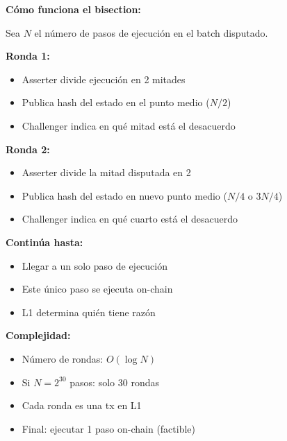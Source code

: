 \documentclass[11pt,a4paper,twoside,openright]{book}
\theoremstyle{definition}
\theoremstyle{plain}
\theoremstyle{remark}
\begin{document}
\begin{mathnote}
\textbf{Cómo funciona el bisection:}

Sea $N$ el número de pasos de ejecución en el batch disputado.

\textbf{Ronda 1:}
\begin{itemize}
    \item Asserter divide ejecución en 2 mitades
    \item Publica hash del estado en el punto medio ($N/2$)
    \item Challenger indica en qué mitad está el desacuerdo
\end{itemize}

\textbf{Ronda 2:}
\begin{itemize}
    \item Asserter divide la mitad disputada en 2
    \item Publica hash del estado en nuevo punto medio ($N/4$ o $3N/4$)
    \item Challenger indica en qué cuarto está el desacuerdo
\end{itemize}

\textbf{Continúa hasta:}
\begin{itemize}
    \item Llegar a un solo paso de ejecución
    \item Este único paso se ejecuta on-chain
    \item L1 determina quién tiene razón
\end{itemize}

\textbf{Complejidad:}
\begin{itemize}
    \item Número de rondas: $O(\log N)$
    \item Si $N = 2^{30}$ pasos: solo 30 rondas
    \item Cada ronda es una tx en L1
    \item Final: ejecutar 1 paso on-chain (factible)
\end{itemize}
\end{mathnote}
\end{document}
